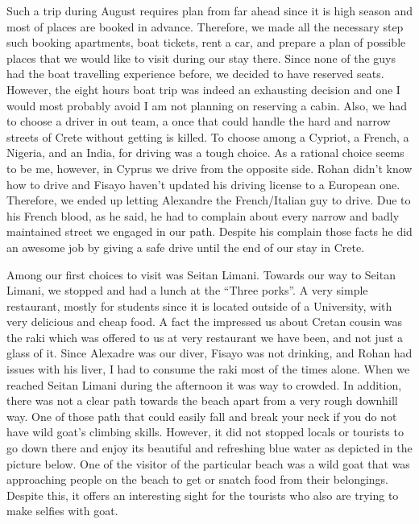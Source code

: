 \documentclass[10pt,a4paper]{article} %
\begin{document}
\begin{multicols}{3}
Such a trip during August requires plan from far ahead since it is high season 
and most of places are booked in advance. 
Therefore, we made all the necessary step such booking apartments, boat tickets, 
rent a car, and prepare a plan of possible places that we would like to visit 
during our stay there. 
Since none of the guys had the boat travelling experience before, we decided 
to have reserved seats. 
However, the eight hours boat trip was indeed an exhausting decision and one 
I would most probably avoid I am not planning on reserving a cabin.  
Also, we had to choose a driver in out team, a once that could handle the 
hard and narrow streets of Crete without getting is killed. 
To choose among a Cypriot, a French, a Nigeria, and an India, for driving 
was a tough choice. 
As a rational choice seems to be me, however, in Cyprus we drive from the 
opposite side. 
Rohan didn't know how to drive and Fisayo haven't updated his driving license 
to a European one. 
Therefore, we ended up letting Alexandre the French/Italian guy to drive. 
Due to his French blood, as he said, he had to complain about every narrow and 
badly maintained street we engaged in our path. 
Despite his complain those facts he did an awesome job by giving a safe drive 
until the end of our stay in Crete. 


Among our first choices to visit was Seitan Limani. 
Towards our way to Seitan Limani, we stopped and had a lunch at the 
``Three porks''. 
A very simple restaurant, mostly for students since it is located outside 
of a University, with very delicious and cheap food. 
A fact the impressed us about Cretan cousin was the raki which was offered to us 
at very restaurant we have been, and not just a glass of it. 
Since Alexadre was our diver, Fisayo was not drinking, and Rohan had issues with his 
liver, I had to consume the raki most of the times alone. 
When we reached Seitan Limani during the afternoon it was way to crowded. 
In addition, there was not a clear path towards the beach apart from a very 
rough downhill way. 
One of those path that could easily fall and break your neck if you do not have 
wild goat's climbing skills. 
However, it did not stopped locals or tourists to go down there and enjoy its 
beautiful and refreshing blue water as depicted in the picture below. 
One of the visitor of the particular beach was a wild goat that was approaching 
people on the beach to get or snatch food from their belongings. 
Despite this, it offers an interesting sight for the tourists who also are trying 
to make selfies with goat.   


\end{multicols}
\end{document}
